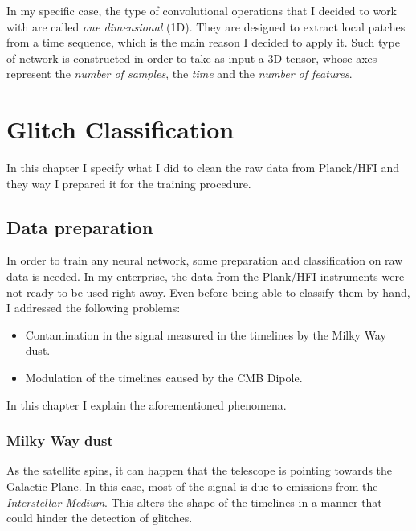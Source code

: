 \documentclass[12pt,a4paper,final]{book}			%
\begin{document}
			In my specific case, the type of convolutional operations that I decided to work with are called \textit{one dimensional} (1D). They are designed to extract local patches from a time sequence, which is the main reason I decided to apply it. Such type of network is constructed in order to take as input a 3D tensor, whose axes represent the \textit{number of samples}, the \textit{time} and the \textit{number of features}. 
			
			
%
%
\chapter{Glitch Classification}\label{glitch_classification}
\label{data_preparation}

In this chapter I specify what I did to clean the raw data from Planck/HFI and they way I prepared it for the training procedure.

	\section{Data preparation} \label{data_preparation}
		In order to train any neural network, some preparation and classification on raw data is needed. In my enterprise, the data from the Plank/HFI instruments were not ready to be used right away. Even before being able to classify them by hand, I addressed the following problems:
		\begin{itemize}
			\item Contamination in the signal measured in the timelines by the Milky Way dust.
			\item Modulation of the timelines caused by the CMB Dipole.
		\end{itemize}
		In this chapter I explain the aforementioned phenomena.
		
		\subsection{Milky Way dust} \label{Milky_way}
		
		As the satellite spins, it can happen that the telescope is pointing towards the Galactic Plane. In this case, most of the signal is due to emissions from the \textit{Interstellar Medium}. This alters the shape of the timelines in a manner that could hinder the detection of glitches.
		
\end{document}
